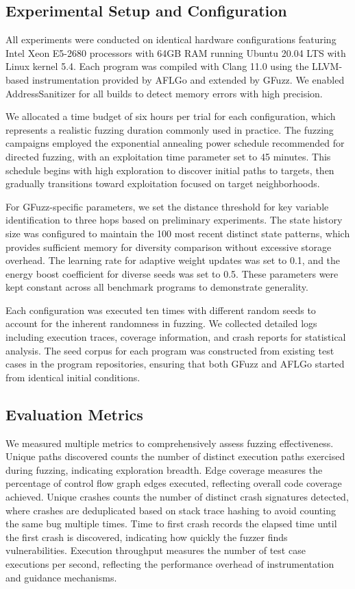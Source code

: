 \documentclass[review]{elsarticle}
\begin{document}
\subsection{Experimental Setup and Configuration}

All experiments were conducted on identical hardware configurations featuring Intel Xeon E5-2680 processors with 64GB RAM running Ubuntu 20.04 LTS with Linux kernel 5.4. Each program was compiled with Clang 11.0 using the LLVM-based instrumentation provided by AFLGo and extended by GFuzz. We enabled AddressSanitizer for all builds to detect memory errors with high precision.

We allocated a time budget of six hours per trial for each configuration, which represents a realistic fuzzing duration commonly used in practice. The fuzzing campaigns employed the exponential annealing power schedule recommended for directed fuzzing, with an exploitation time parameter set to 45 minutes. This schedule begins with high exploration to discover initial paths to targets, then gradually transitions toward exploitation focused on target neighborhoods.

For GFuzz-specific parameters, we set the distance threshold for key variable identification to three hops based on preliminary experiments. The state history size was configured to maintain the 100 most recent distinct state patterns, which provides sufficient memory for diversity comparison without excessive storage overhead. The learning rate for adaptive weight updates was set to 0.1, and the energy boost coefficient for diverse seeds was set to 0.5. These parameters were kept constant across all benchmark programs to demonstrate generality.

Each configuration was executed ten times with different random seeds to account for the inherent randomness in fuzzing. We collected detailed logs including execution traces, coverage information, and crash reports for statistical analysis. The seed corpus for each program was constructed from existing test cases in the program repositories, ensuring that both GFuzz and AFLGo started from identical initial conditions.

\subsection{Evaluation Metrics}

We measured multiple metrics to comprehensively assess fuzzing effectiveness. Unique paths discovered counts the number of distinct execution paths exercised during fuzzing, indicating exploration breadth. Edge coverage measures the percentage of control flow graph edges executed, reflecting overall code coverage achieved. Unique crashes counts the number of distinct crash signatures detected, where crashes are deduplicated based on stack trace hashing to avoid counting the same bug multiple times. Time to first crash records the elapsed time until the first crash is discovered, indicating how quickly the fuzzer finds vulnerabilities. Execution throughput measures the number of test case executions per second, reflecting the performance overhead of instrumentation and guidance mechanisms.
\end{document}
